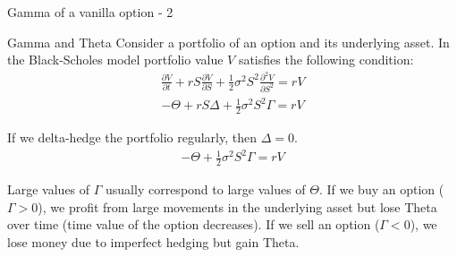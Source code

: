 \documentclass{beamer}
\begin{document}
\begin{frame}{Gamma of a vanilla option - 2}
\centering
{}
\end{frame}



\begin{frame}{Gamma and Theta}
\justify
Consider a portfolio of an option and its underlying asset. In the Black-Scholes model portfolio value $V$ satisfies the following condition:
\begin{align*}
\frac{\partial V}{\partial t} + rS\frac{\partial V}{\partial S} + \frac{1}{2}\sigma^2S^2\frac{\partial^2 V}{\partial S^2} = rV
\end{align*}
\begin{align*}
-\Theta + rS\Delta + \frac{1}{2}\sigma^2S^2\Gamma = rV
\end{align*}

If we delta-hedge the portfolio regularly, then $\Delta=0$.
\begin{align*}
-\Theta + \frac{1}{2}\sigma^2S^2\Gamma = rV
\end{align*}

\justify
Large values of $\Gamma$ usually correspond to large values of $\Theta$. If we buy an option ($\Gamma > 0$), we profit from large movements in the underlying asset but lose Theta over time (time value of the option decreases). If we sell an option ($\Gamma < 0$), we lose money due to imperfect hedging but gain Theta.
\end{frame}
\end{document}
